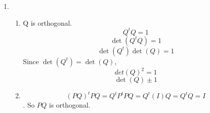 \documentclass[12pt]{article}
\begin{document}
\begin{enumerate}[leftmargin=0em]
\begin{enumerate}[leftmargin=!]
        \[a_3 = \frac{1}{\pi} \left[ \frac{e^x (3 \sin(3x) + \cos(3x))}{10} \right]_{-\pi}^{\pi}= -\frac{1}{10\pi}(e^{\pi} - e^{-\pi})\]
        \[b_3 = \frac{1}{\pi} \left[ \frac{e^x (\sin(3x) - 3 \cos(3x))}{10} \right]_{-\pi}^{\pi}= \frac{3}{10\pi}(e^{\pi} - e^{-\pi})\]

        Evaluating numerically, we have:
        \[S_3(x) \approx 3.6767 - 3.6767\cos(x) + 3.6767\sin(x) + 1.4707\cos(2x) - 2.9414\sin(2x) - 0.7353\cos(3x) + 2.2060\sin(3x)\]

        \item
        We must calculate \(\langle y,\phi _{k}\rangle \) for \(k=0,1,2,3\) 
        \[\langle y,\phi _{k}\rangle =\frac{1}{10}\sum _{j=0}^{19}y_{j}\cos (kx_{j})\]
        First, calculate \(\langle y,\phi _{0}\rangle \),
        \(\langle y,\phi _{1}\rangle \), \(\langle y,\phi _{2}\rangle \), and \(\langle y,\phi _{3}\rangle \).
        \[\langle y,\phi _{0}\rangle =\frac{1}{10}\sum _{j=0}^{19}y_{j}\cos (0)=\frac{1}{10}\sum _{j=0}^{19}y_{j}\]
        \[\langle y,\phi _{1}\rangle =\frac{1}{10}\sum _{j=0}^{19}y_{j}\cos (x_{j})\]
        \[\langle y,\phi _{2}\rangle =\frac{1}{10}\sum _{j=0}^{19}y_{j}\cos (2x_{j})\]
        \[\langle y,\phi _{3}\rangle =\frac{1}{10}\sum _{j=0}^{19}y_{j}\cos (3x_{j})\]

        Next, calculate \(\langle y,\psi _{k}\rangle \) for \(k=1,2,3\)
        \[\langle y,\psi _{k}\rangle =\frac{1}{10}\sum _{j=0}^{19}y_{j}\sin (kx_{j})\]
        \[\langle y,\psi _{1}\rangle =\frac{1}{10}\sum _{j=0}^{19}y_{j}\sin (x_{j})\) \[\langle y,\psi _{2}\rangle =\frac{1}{10}\sum _{j=0}^{19}y_{j}\sin (2x_{j})\]
        \[\langle y,\psi _{3}\rangle =\frac{1}{10}\sum _{j=0}^{19}y_{j}\sin (3x_{j})\]

        \[S_{3}(x)=\frac{1}{2}\langle y,\phi _{0}\rangle +\sum _{k=1}^{3}(\langle y,\phi _{k}\rangle \cos (kx))+\sum _{k=1}^{3}(\langle y,\psi _{k}\rangle \sin (kx))\]
        \[S_{3}(x)=\frac{1}{2}\langle y,\phi _{0}\rangle +\langle y,\phi _{1}\rangle \cos (x)+\langle y,\phi _{2}\rangle \cos (2x)+\langle y,\phi _{3}\rangle \cos (3x)+\langle y,\psi _{1}\rangle \sin (x)+\langle y,\psi _{2}\rangle \sin (2x)+\langle y,\psi _{3}\rangle \sin (3x)\]
        
        \[S_{3}(x)\approx 3.676+2.963\cos (x)+0.946\cos (2x)+0.164\cos (3x)-1.263\sin (x)-0.740\sin (2x)-0.214\sin (3x)\]
        
    \end{enumerate} 

    \item
    \begin{enumerate}[leftmargin=!]
        \item Q is orthogonal.
        \[ Q^{t}Q=1\]
        \[\det(Q^tQ) = 1\]
        \[\det(Q^t)\det(Q)=1\]
        Since $\det(Q^t) = \det(Q)$,
        \[det(Q)^2 = 1\]
        \[\det(Q)\pm 1\]
        \item
        \[(PQ)^tPQ = Q^tP^tPQ = Q^t(I)Q = Q^tQ=I\].
        So $PQ$ is orthogonal.
    \end{enumerate}


\end{enumerate}
\end{document}
